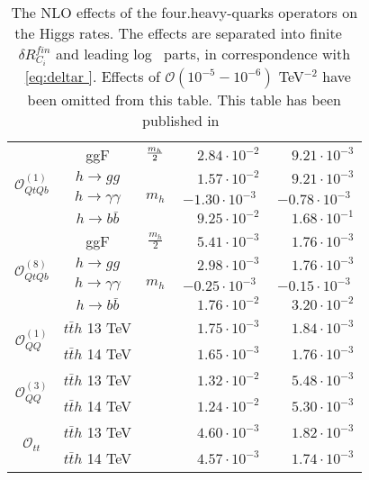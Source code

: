 \begin{table}[t!]
{\begin{tabular}{c||cccc}
                       	                                                   	\midrule
           \multirow{4}{*}{ { \normalsize$\mathcal{O}_{QtQb}^{(1)}$} } & ggF& ${m_h\over 2}$&$\phantom{+}2.84\cdot 10^{-2}$&$\phantom{+}9.21\cdot 10^{-3}$\\   %
            &  $h \to gg$& \multirow{3}{*}{$m_h$}&$\phantom{+}1.57\cdot 10^{-2}$&$\phantom{+}9.21\cdot 10^{-3}$\\
           &  $h \to \gamma \gamma$& &$-1.30\cdot 10^{-3}$&$-0.78\cdot 10^{-3}$\\
           &  $h \to b \bar b$& &$\phantom{+}9.25\cdot 10^{-2}$&$\phantom{+}1.68\cdot 10^{-1}$\\
			\midrule
			 \multirow{4}{*}{{ \normalsize$\mathcal{O}_{QtQb}^{(8)}$}}  & ggF& {$\frac{m_h}{ 2}$}&$\phantom{+}5.41\cdot 10^{-3}$&$\phantom{+}1.76\cdot 10^{-3}$\\      %
			 & $h \to gg$& \multirow{3}{*}{$m_h$}&$\phantom{+}2.98\cdot 10^{-3}$&$\phantom{+}1.76\cdot 10^{-3}$\\
			&  $h \to \gamma \gamma$& &$-0.25\cdot 10^{-3}$& $-0.15\cdot 10^{-3}$\\
			&  $h \to b \bar b$& &$\phantom{+}1.76\cdot 10^{-2}$&$\phantom{+}3.20\cdot 10^{-2}$\\
			\midrule	    	 
			 \multirow{2}{*}{{ \normalsize$\mathcal{O}_{QQ}^{(1)}$}  }
			 	&  $t\bar t h$ {\color{Mahogany}  13 TeV }& \mr{$m_t+\frac{m_h}{ 2}$}&  {$\phantom{+}1.75\cdot 10^{-3}$} &$\phantom{+}1.84\cdot 10^{-3}$\\	    
			 &   $t\bar t h$  {\color{Mahogany}  14 TeV }& & $\phantom{+}1.65\cdot 10^{-3}$& $\phantom{+}1.76\cdot 10^{-3}$\\          
			 \midrule	    	 
			 \multirow{2}{*}{{ \normalsize$\mathcal{O}_{QQ}^{(3)}$}  }
			 &  $t\bar t h$ {\color{Mahogany}  13 TeV }& \mr{$m_t+\frac{m_h}{ 2}$}&  $\phantom{+}1.32\cdot 10^{-2}$ & $\phantom{+}5.48\cdot 10^{-3}$\\	    
			 &   $t\bar t h$  {\color{Mahogany}  14 TeV }& & $\phantom{+}1.24\cdot 10^{-2}$& $\phantom{+}5.30\cdot 10^{-3}$\\        
			  \midrule	    	 
			 \multirow{2}{*}{{ \normalsize$\mathcal{O}_{tt}$}  }
			 &  $t\bar t h$ {\color{Mahogany}  13 TeV }& \mr{$m_t+\frac{m_h}{ 2}$}&  $\phantom{+}4.60\cdot 10^{-3}$ &$\phantom{+}1.82\cdot 10^{-3}$\\	    
			 &   $t\bar t h$  {\color{Mahogany}  14 TeV }& & $\phantom{+}4.57\cdot 10^{-3}$& $\phantom{+}1.74\cdot 10^{-3}$\\                                           	
			\bottomrule
		\end{tabular}
	}
\caption{The NLO effects of the four.heavy-quarks operators on the Higgs rates. The effects are separated into finite ~$ \delta R_{C_i}^{fin}$ and leading log~ parts, in correspondence with ~\eqref{eq:deltar }. Effects of $\mathcal{O}(10^{-5}-10^{-6})$ TeV$^{-2}$  have been omitted from this table. This table has been published in~\cite{Alasfar:2022zyr}}
\label{table:res4top}
\end{table}

